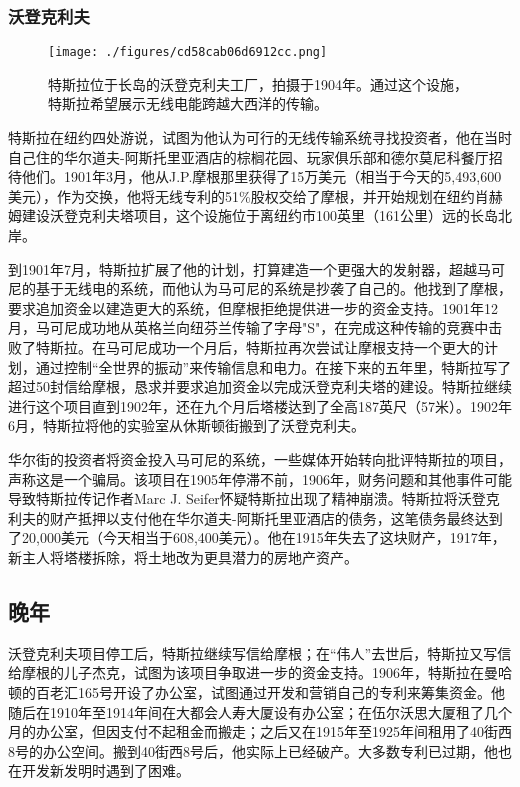 \subsubsection{沃登克利夫}
\begin{figure}[ht]
\centering
\texttt{[image: ./figures/cd58cab06d6912cc.png]}
\caption{特斯拉位于长岛的沃登克利夫工厂，拍摄于1904年。通过这个设施，特斯拉希望展示无线电能跨越大西洋的传输。} \label{fig_Tesla_13}
\end{figure}
特斯拉在纽约四处游说，试图为他认为可行的无线传输系统寻找投资者，他在当时自己住的华尔道夫-阿斯托里亚酒店的棕榈花园、玩家俱乐部和德尔莫尼科餐厅招待他们。1901年3月，他从J.P.摩根那里获得了15万美元（相当于今天的5,493,600美元），作为交换，他将无线专利的51\%股权交给了摩根，并开始规划在纽约肖赫姆建设沃登克利夫塔项目，这个设施位于离纽约市100英里（161公里）远的长岛北岸。

到1901年7月，特斯拉扩展了他的计划，打算建造一个更强大的发射器，超越马可尼的基于无线电的系统，而他认为马可尼的系统是抄袭了自己的。他找到了摩根，要求追加资金以建造更大的系统，但摩根拒绝提供进一步的资金支持。1901年12月，马可尼成功地从英格兰向纽芬兰传输了字母"S"，在完成这种传输的竞赛中击败了特斯拉。在马可尼成功一个月后，特斯拉再次尝试让摩根支持一个更大的计划，通过控制“全世界的振动”来传输信息和电力。在接下来的五年里，特斯拉写了超过50封信给摩根，恳求并要求追加资金以完成沃登克利夫塔的建设。特斯拉继续进行这个项目直到1902年，还在九个月后塔楼达到了全高187英尺（57米）。1902年6月，特斯拉将他的实验室从休斯顿街搬到了沃登克利夫。

华尔街的投资者将资金投入马可尼的系统，一些媒体开始转向批评特斯拉的项目，声称这是一个骗局。该项目在1905年停滞不前，1906年，财务问题和其他事件可能导致特斯拉传记作者Marc J. Seifer怀疑特斯拉出现了精神崩溃。特斯拉将沃登克利夫的财产抵押以支付他在华尔道夫-阿斯托里亚酒店的债务，这笔债务最终达到了20,000美元（今天相当于608,400美元）。他在1915年失去了这块财产，1917年，新主人将塔楼拆除，将土地改为更具潜力的房地产资产。
\subsection{晚年}  
沃登克利夫项目停工后，特斯拉继续写信给摩根；在“伟人”去世后，特斯拉又写信给摩根的儿子杰克，试图为该项目争取进一步的资金支持。1906年，特斯拉在曼哈顿的百老汇165号开设了办公室，试图通过开发和营销自己的专利来筹集资金。他随后在1910年至1914年间在大都会人寿大厦设有办公室；在伍尔沃思大厦租了几个月的办公室，但因支付不起租金而搬走；之后又在1915年至1925年间租用了40街西8号的办公空间。搬到40街西8号后，他实际上已经破产。大多数专利已过期，他也在开发新发明时遇到了困难。
